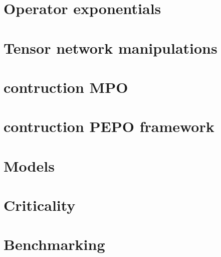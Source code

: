 \documentclass{article}
\begin{document}
\section{Operator exponentials}


\section{Tensor network manipulations}


\section{contruction MPO}


\section{contruction PEPO framework}


\section{Models}


\section{Criticality}


\section{Benchmarking}




\end{document}
